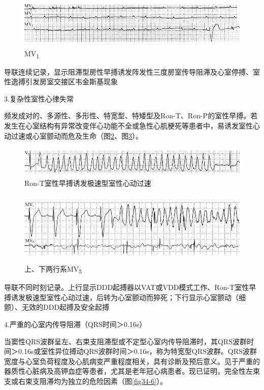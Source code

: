 \begin{figure}[!htbp]
 \centering
 \includegraphics[width=5.58333in,height=0.95833in]{./images/Image00543.jpg}
 \captionsetup{justification=centering}
 \caption{MV\textsubscript{1}}
 \label{fig34-3}
  \end{figure} 
导联连续记录，显示阻滞型房性早搏诱发阵发性三度房室传导阻滞及心室停搏、室性逸搏引发房室交接区韦金斯基现象

3.复杂性室性心律失常

频发成对的、多源性、多形性、特宽型、特矮型及Ron-T、Ron-P的室性早搏。若发生在心室结构有异常改变伴心功能不全或急性心肌梗死等患者中，易诱发室性心动过速或心室颤动而危及生命（图\ref{fig34-4}、图\ref{fig34-5}）。

\begin{figure}[!htbp]
 \centering
 \includegraphics[width=5.58333in,height=0.57292in]{./images/Image00544.jpg}
 \captionsetup{justification=centering}
 \caption{Ron-T室性早搏诱发极速型室性心动过速}
 \label{fig34-4}
  \end{figure} 

\begin{figure}[!htbp]
 \centering
 \includegraphics[width=5.58333in,height=1.36458in]{./images/Image00545.jpg}
 \captionsetup{justification=centering}
 \caption{上、下两行系MV\textsubscript{5}}
 \label{fig34-5}
  \end{figure} 
导联不同时刻记录。上行显示DDD起搏器以VAT或VDD模式工作、Ron-T室性早搏诱发极速型室性心动过速，后转为心室颤动而猝死；下行显示心室颤动（细颤）、无效的DDD起搏及安全起搏

4.严重的心室内传导阻滞（QRS时间＞0.16s）

当窦性QRS波群呈左、右束支阻滞型或不定型心室内传导阻滞时，其QRS波群时间＞0.16s或室性异位搏动QRS波群时间＞0.16s，称为特宽型QRS波群。QRS波群宽度与心室负荷程度及心肌病变严重程度相关，具有诊断及预后意义。见于严重的器质性心脏病及高钾血症等患者，尤其是老年冠心病患者。现已证明，完全性左束支或右束支阻滞均为独立的危险因素（图\ref{fig34-6}）。

